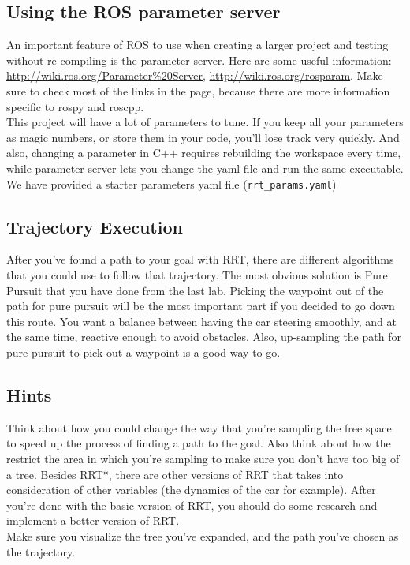 \documentclass[letta4 paper]{article}
\numberwithin{equation}{section}
\newcommand{\0}{\mathbf{0}}
\begin{document}
	\subsection{Using the ROS parameter server}
	An important feature of ROS to use when creating a larger project and testing without re-compiling is the parameter server. Here are some useful information: \href{http://wiki.ros.org/Parameter\%20Server}{http://wiki.ros.org/Parameter\%20Server}, \href{http://wiki.ros.org/rosparam}{http://wiki.ros.org/rosparam}. Make sure to check most of the links in the page, because there are more information specific to rospy and roscpp.\\
	This project will have a lot of parameters to tune. If you keep all your parameters as magic numbers, or store them in your code, you'll lose track very quickly. And also, changing a parameter in C++ requires rebuilding the workspace every time, while parameter server lets you change the yaml file and run the same executable. We have provided a starter parameters yaml file (\texttt{rrt\_params.yaml})\\
	
	\subsection{Trajectory Execution}
	After you've found a path to your goal with RRT, there are different algorithms that you could use to follow that trajectory. The most obvious solution is Pure Pursuit that you have done from the last lab. Picking the waypoint out of the path for pure pursuit will be the most important part if you decided to go down this route. You want a balance between having the car steering smoothly, and at the same time, reactive enough to avoid obstacles. Also, up-sampling the path for pure pursuit to pick out a waypoint is a good way to go.\\
	
	\subsection{Hints}
	Think about how you could change the way that you're sampling the free space to speed up the process of finding a path to the goal. Also think about how the restrict the area in which you're sampling to make sure you don't have too big of a tree. Besides RRT*, there are other versions of RRT that takes into consideration of other variables (the dynamics of the car for example). After you're done with the basic version of RRT, you should do some research and implement a better version of RRT.\\
	Make sure you visualize the tree you've expanded, and the path you've chosen as the trajectory.
	
\end{document}
